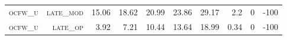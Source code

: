 \begin{landscape}
\begin{table}[!htbp]
\begin{tabular}{@{}rrrrrrr|rrr@{}}
\footnotesize \textsc{ocfw\_u}     & \footnotesize \textsc{late\_mod }      & \footnotesize 15.06          & \footnotesize 18.62            & \footnotesize 20.99     & \footnotesize 23.86           & \footnotesize 29.17      & \footnotesize 2.2      & \footnotesize 0     & \footnotesize -100    \\
\footnotesize \textsc{ocfw\_u}     & \footnotesize \textsc{late\_op  }      & \footnotesize 3.92           & \footnotesize 7.21             & \footnotesize 10.44     & \footnotesize 13.64           & \footnotesize 18.99      & \footnotesize 0.34     & \footnotesize 0     & \footnotesize -100      \\
\end{tabular}
\end{table}
\end{landscape}

